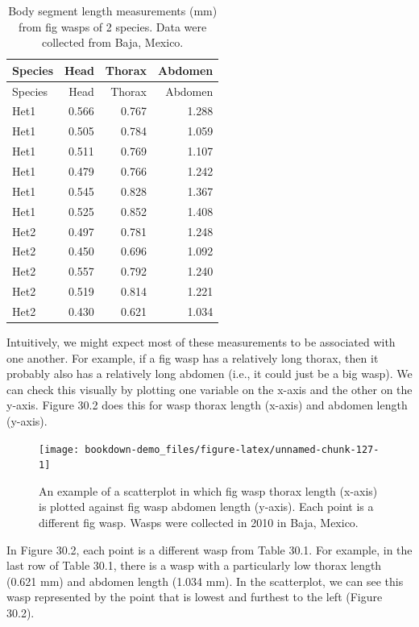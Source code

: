 \documentclass[
  openany]{scrbook}
\begin{document}
\begin{longtable}[]{@{}lrrr@{}}
\caption{\label{tab:unnamed-chunk-126}Body segment length measurements (mm) from fig wasps of 2 species. Data were collected from Baja, Mexico.}\tabularnewline
\toprule
Species & Head & Thorax & Abdomen \\
\midrule
\endfirsthead
\toprule
Species & Head & Thorax & Abdomen \\
\midrule
\endhead
Het1 & 0.566 & 0.767 & 1.288 \\
Het1 & 0.505 & 0.784 & 1.059 \\
Het1 & 0.511 & 0.769 & 1.107 \\
Het1 & 0.479 & 0.766 & 1.242 \\
Het1 & 0.545 & 0.828 & 1.367 \\
Het1 & 0.525 & 0.852 & 1.408 \\
Het2 & 0.497 & 0.781 & 1.248 \\
Het2 & 0.450 & 0.696 & 1.092 \\
Het2 & 0.557 & 0.792 & 1.240 \\
Het2 & 0.519 & 0.814 & 1.221 \\
Het2 & 0.430 & 0.621 & 1.034 \\
\bottomrule
\end{longtable}

Intuitively, we might expect most of these measurements to be associated with one another.
For example, if a fig wasp has a relatively long thorax, then it probably also has a relatively long abdomen (i.e., it could just be a big wasp).
We can check this visually by plotting one variable on the x-axis and the other on the y-axis.
Figure 30.2 does this for wasp thorax length (x-axis) and abdomen length (y-axis).

\begin{figure}
\texttt{[image: bookdown-demo\_files/figure-latex/unnamed-chunk-127-1]} \caption{An example of a scatterplot in which fig wasp thorax length (x-axis) is plotted against fig wasp abdomen length (y-axis). Each point is a different fig wasp. Wasps were collected in 2010 in Baja, Mexico.}\label{fig:unnamed-chunk-127}
\end{figure}

In Figure 30.2, each point is a different wasp from Table 30.1.
For example, in the last row of Table 30.1, there is a wasp with a particularly low thorax length (0.621 mm) and abdomen length (1.034 mm).
In the scatterplot, we can see this wasp represented by the point that is lowest and furthest to the left (Figure 30.2).
\end{document}
